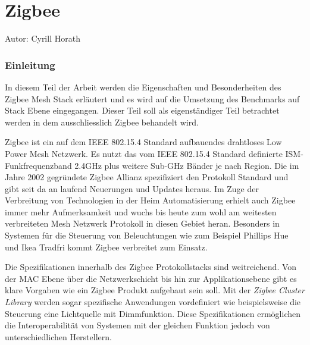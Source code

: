 \vspace*{4cm}
\part{Zigbee}\label{part:Zigbee}
Autor: Cyrill Horath
\vspace*{\fill}
\clearpage

\section{Einleitung}\label{sec:EinleitungZigbee}
In diesem Teil der Arbeit werden die Eigenschaften und Besonderheiten des Zigbee Mesh Stack erläutert und es wird auf die Umsetzung des Benchmarks auf Stack Ebene eingegangen. Dieser Teil soll als eigenständiger Teil betrachtet werden in dem ausschliesslich Zigbee behandelt wird.

Zigbee ist ein auf dem IEEE 802.15.4 Standard aufbauendes drahtloses Low Power Mesh Netzwerk. Es nutzt das vom IEEE 802.15.4 Standard definierte ISM-Funkfrequenzband 2.4GHz plus weitere Sub-GHz Bänder je nach Region.
Die im Jahre 2002 gegründete Zigbee Allianz spezifiziert den Protokoll Standard und gibt seit da an laufend Neuerungen und Updates heraus.
Im Zuge der Verbreitung von Technologien in der Heim Automatisierung erhielt auch Zigbee immer mehr Aufmerksamkeit und wuchs bis heute zum wohl am weitesten verbreiteten Mesh Netzwerk Protokoll in diesen Gebiet heran. Besonders in Systemen für die Steuerung von Beleuchtungen wie zum Beispiel Phillips Hue und Ikea Tradfri kommt Zigbee verbreitet zum Einsatz.

Die Spezifikationen innerhalb des Zigbee Protokollstacks sind weitreichend. Von der MAC Ebene über die Netzwerkschicht bis hin zur Applikationsebene gibt es klare Vorgaben wie ein Zigbee Produkt aufgebaut sein soll.
Mit der \textit{Zigbee Cluster Library} werden sogar spezifische Anwendungen vordefiniert wie beispielsweise die Steuerung eine Lichtquelle mit Dimmfunktion.
Diese Spezifikationen ermöglichen die Interoperabilität von Systemen mit der gleichen Funktion jedoch von unterschiedlichen Herstellern.




